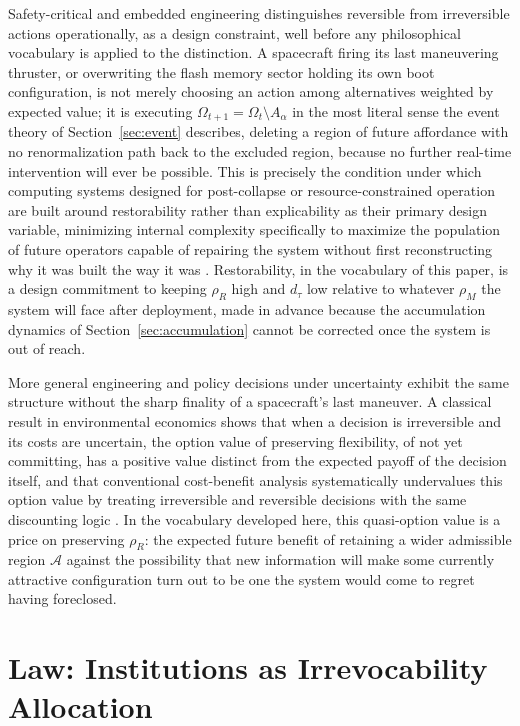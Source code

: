 \documentclass[11pt]{article}
\theoremstyle{plain}
\begin{document}
Safety-critical and embedded engineering distinguishes reversible from irreversible actions operationally, as a design constraint, well before any philosophical vocabulary is applied to the distinction. A spacecraft firing its last maneuvering thruster, or overwriting the flash memory sector holding its own boot configuration, is not merely choosing an action among alternatives weighted by expected value; it is executing $\Omega_{t+1} = \Omega_t \setminus A_\alpha$ in the most literal sense the event theory of Section~\ref{sec:event} describes, deleting a region of future affordance with no renormalization path back to the excluded region, because no further real-time intervention will ever be possible. This is precisely the condition under which computing systems designed for post-collapse or resource-constrained operation are built around restorability rather than explicability as their primary design variable, minimizing internal complexity specifically to maximize the population of future operators capable of repairing the system without first reconstructing why it was built the way it was \citep{ziembik2025}. Restorability, in the vocabulary of this paper, is a design commitment to keeping $\rho_R$ high and $d_\tau$ low relative to whatever $\rho_M$ the system will face after deployment, made in advance because the accumulation dynamics of Section~\ref{sec:accumulation} cannot be corrected once the system is out of reach.

More general engineering and policy decisions under uncertainty exhibit the same structure without the sharp finality of a spacecraft's last maneuver. A classical result in environmental economics shows that when a decision is irreversible and its costs are uncertain, the option value of preserving flexibility, of not yet committing, has a positive value distinct from the expected payoff of the decision itself, and that conventional cost-benefit analysis systematically undervalues this option value by treating irreversible and reversible decisions with the same discounting logic \citep{arrowfisher1974}. In the vocabulary developed here, this quasi-option value is a price on preserving $\rho_R$: the expected future benefit of retaining a wider admissible region $\mathcal{A}$ against the possibility that new information will make some currently attractive configuration turn out to be one the system would come to regret having foreclosed.

\section{Law: Institutions as Irrevocability Allocation}
\label{sec:legal}
\end{document}
